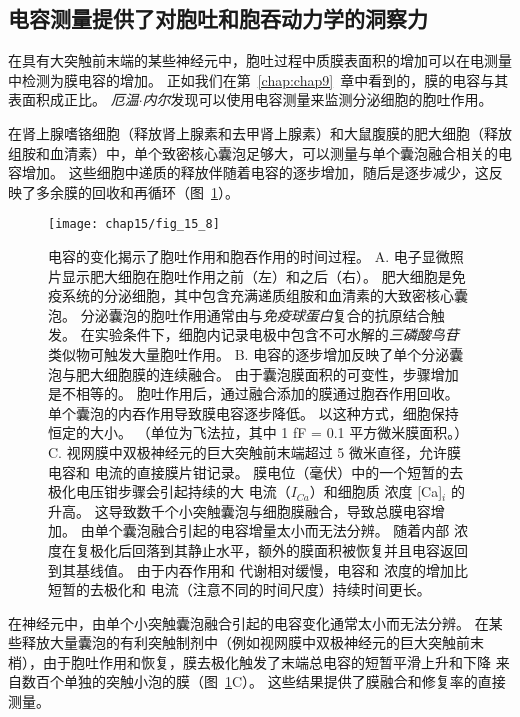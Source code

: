 \subsection{电容测量提供了对胞吐和胞吞动力学的洞察力}

在具有大突触前末端的某些神经元中，胞吐过程中质膜表面积的增加可以在电测量中检测为膜电容的增加。
正如我们在第~\ref{chap:chap9}~章中看到的，膜的电容与其表面积成正比。
\textit{厄温$\cdot$内尔}发现可以使用电容测量来监测分泌细胞的胞吐作用。


在肾上腺嗜铬细胞（释放肾上腺素和去甲肾上腺素）和大鼠腹膜的肥大细胞（释放组胺和血清素）中，单个致密核心囊泡足够大，可以测量与单个囊泡融合相关的电容增加。
这些细胞中递质的释放伴随着电容的逐步增加，随后是逐步减少，这反映了多余膜的回收和再循环（图~\ref{fig:15_8}）。


\begin{figure}[htbp]
	\centering
	\texttt{[image: chap15/fig\_15\_8]}
	\caption{电容的变化揭示了胞吐作用和胞吞作用的时间过程。
		A. 电子显微照片显示肥大细胞在胞吐作用之前（左）和之后（右）。
		肥大细胞是免疫系统的分泌细胞，其中包含充满递质组胺和血清素的大致密核心囊泡。
		分泌囊泡的胞吐作用通常由与\textit{免疫球蛋白}复合的抗原结合触发。
		在实验条件下，细胞内记录电极中包含不可水解的\textit{三磷酸鸟苷}类似物可触发大量胞吐作用。
		B. 电容的逐步增加反映了单个分泌囊泡与肥大细胞膜的连续融合。
		由于囊泡膜面积的可变性，步骤增加是不相等的。
		胞吐作用后，通过融合添加的膜通过胞吞作用回收。
		单个囊泡的内吞作用导致膜电容逐步降低。
		以这种方式，细胞保持恒定的大小。 （单位为飞法拉，其中 1 fF = 0.1 平方微米膜面积。）\cite{fernandez1984capacitance}
		C. 视网膜中双极神经元的巨大突触前末端超过 5 微米直径，允许膜电容和  电流的直接膜片钳记录。
		膜电位（毫伏）中的一个短暂的去极化电压钳步骤会引起持续的大  电流（$I_{Ca}$）和细胞质  浓度 [Ca]$_i$ 的升高。
		这导致数千个小突触囊泡与细胞膜融合，导致总膜电容增加。
		由单个囊泡融合引起的电容增量太小而无法分辨。
		随着内部  浓度在复极化后回落到其静止水平，额外的膜面积被恢复并且电容返回到其基线值。
		由于内吞作用和  代谢相对缓慢，电容和  浓度的增加比短暂的去极化和  电流（注意不同的时间尺度）持续时间更长\cite{zenisek2004visualizing}。}
	\label{fig:15_8}
\end{figure}


在神经元中，由单个小突触囊泡融合引起的电容变化通常太小而无法分辨。
在某些释放大量囊泡的有利突触制剂中（例如视网膜中双极神经元的巨大突触前末梢），由于胞吐作用和恢复，膜去极化触发了末端总电容的短暂平滑上升和下降 来自数百个单独的突触小泡的膜（图~\ref{fig:15_8}C）。 
这些结果提供了膜融合和修复率的直接测量。



